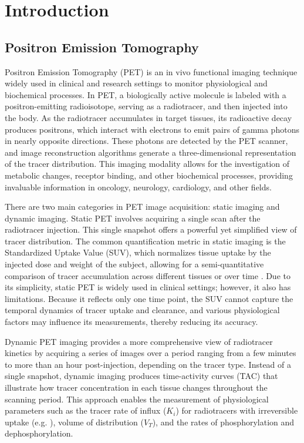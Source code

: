 \chapter{Introduction}

\section{Positron Emission Tomography}
Positron Emission Tomography (PET) is an in vivo functional imaging technique widely used in clinical and research settings to monitor physiological and biochemical processes.
In PET, a biologically active molecule is labeled with a positron-emitting radioisotope, serving as a radiotracer, and then injected into the body.
As the radiotracer accumulates in target tissues, its radioactive decay produces positrons, which interact with electrons to emit pairs of gamma photons in nearly opposite directions.
These photons are detected by the PET scanner, and image reconstruction algorithms generate a three-dimensional representation of the tracer distribution.
This imaging modality allows for the investigation of metabolic changes, receptor binding, and other biochemical processes, providing invaluable information in oncology, neurology, cardiology, and other fields.

There are two main categories in PET image acquisition: static imaging and dynamic imaging.
Static PET involves acquiring a single scan after the radiotracer injection.
This single snapshot offers a powerful yet simplified view of tracer distribution.
The common quantification metric in static imaging is the Standardized Uptake Value (SUV), which normalizes tissue uptake by the injected dose and weight of the subject, allowing for a semi-quantitative comparison of tracer accumulation across different tissues or over time \cite{keyes1995suv}.
Due to its simplicity, static PET is widely used in clinical settings; however, it also has limitations.
Because it reflects only one time point, the SUV cannot capture the temporal dynamics of tracer uptake and clearance, and various physiological factors may influence its measurements, thereby reducing its accuracy.

Dynamic PET imaging provides a more comprehensive view of radiotracer kinetics by acquiring a series of images over a period ranging from a few minutes to more than an hour post-injection, depending on the tracer type.
Instead of a single snapshot, dynamic imaging produces time-activity curves (TAC) that illustrate how tracer concentration in each tissue changes throughout the scanning period.
This approach enables the measurement of physiological parameters such as the tracer rate of influx (\(K_i\)) for radiotracers with irreversible uptake (e.g. \fdg ), volume of distribution (\(V_T\)), and the rates of phosphorylation and dephosphorylation.

